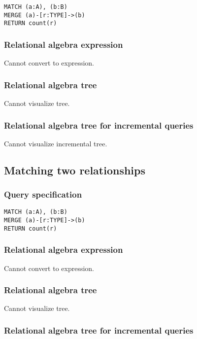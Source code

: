 \begin{lstlisting}
MATCH (a:A), (b:B)
MERGE (a)-[r:TYPE]->(b)
RETURN count(r)
\end{lstlisting}

\subsubsection*{Relational algebra expression}

Cannot convert to expression.

\subsubsection*{Relational algebra tree}

Cannot visualize tree.

\subsubsection*{Relational algebra tree for incremental queries}

Cannot visualize incremental tree.

\subsection{Matching two relationships}

\subsubsection*{Query specification}

\begin{lstlisting}
MATCH (a:A), (b:B)
MERGE (a)-[r:TYPE]->(b)
RETURN count(r)
\end{lstlisting}

\subsubsection*{Relational algebra expression}

Cannot convert to expression.

\subsubsection*{Relational algebra tree}

Cannot visualize tree.

\subsubsection*{Relational algebra tree for incremental queries}

